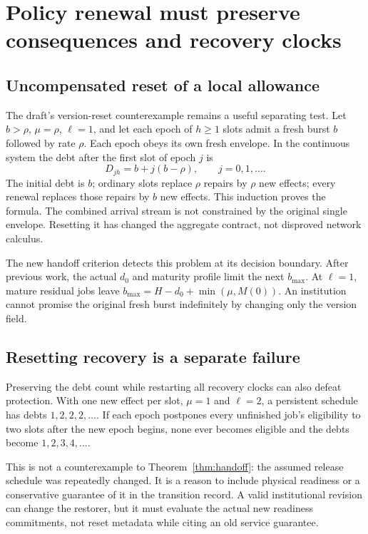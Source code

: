 \section{Policy renewal must preserve consequences and recovery clocks}
\label{sec:renewal}
\subsection{Uncompensated reset of a local allowance}
The draft's version-reset counterexample remains a useful separating test. Let $b>\rho$, $\mu=\rho$, $\ell=1$, and let each epoch of $h\ge1$ slots admit a fresh burst $b$ followed by rate $\rho$. Each epoch obeys its own fresh envelope. In the continuous system the debt after the first slot of epoch $j$ is
\begin{equation}
D_{jh}=b+j(b-\rho),\qquad j=0,1,\ldots .
\label{eq:epoch}
\end{equation}
The initial debt is $b$; ordinary slots replace $\rho$ repairs by $\rho$ new effects; every renewal replaces those repairs by $b$ new effects. This induction proves the formula. The combined arrival stream is not constrained by the original single envelope. Resetting it has changed the aggregate contract, not disproved network calculus.

The new handoff criterion detects this problem at its decision boundary. After previous work, the actual $d_0$ and maturity profile limit the next $b_{\max}$. At $\ell=1$, mature residual jobs leave $b_{\max}=H-d_0+\min(\mu,M(0))$. An institution cannot promise the original fresh burst indefinitely by changing only the version field.

\subsection{Resetting recovery is a separate failure}
Preserving the debt count while restarting all recovery clocks can also defeat protection. With one new effect per slot, $\mu=1$ and $\ell=2$, a persistent schedule has debts $1,2,2,2,\ldots$. If each epoch postpones every unfinished job's eligibility to two slots after the new epoch begins, none ever becomes eligible and the debts become $1,2,3,4,\ldots$.

This is not a counterexample to Theorem~\ref{thm:handoff}: the assumed release schedule was repeatedly changed. It is a reason to include physical readiness or a conservative guarantee of it in the transition record. A valid institutional revision can change the restorer, but it must evaluate the actual new readiness commitments, not reset metadata while citing an old service guarantee.


